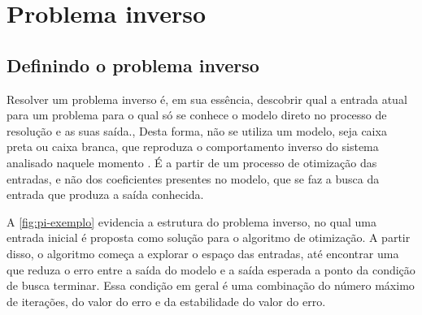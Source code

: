 \chapter{Problema inverso} \label{cha:pi}

\section{Definindo o problema inverso} \label{sec:pi-def}
Resolver um problema inverso é, em sua essência, descobrir qual a entrada atual para um problema para o qual só se conhece o modelo direto no processo de resolução e as suas saída., Desta forma, não se utiliza um modelo, seja caixa preta ou caixa branca, que reproduza o comportamento inverso do sistema analisado naquele momento \cite{ljung1999system}. É a partir de um processo de otimização das entradas, e não dos coeficientes presentes no modelo, que se faz a busca da entrada que produza a saída conhecida.

A \autoref{fig:pi-exemplo} evidencia a estrutura do problema inverso, no qual uma entrada inicial é proposta como solução para o algoritmo de otimização. A partir disso, o algoritmo começa a explorar o espaço das entradas, até encontrar uma que reduza o erro entre a saída do modelo e a saída esperada a ponto da condição de busca terminar. Essa condição em geral é uma combinação do número máximo de iterações, do valor do erro e da estabilidade do valor do erro.


